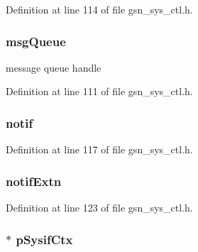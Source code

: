 Definition at line 114 of file gsn\_\-sys\_\-ctl.h.

\hypertarget{a00248_a3525baeed8d9f795ed0c44437f548da2}{
\subsubsection[{msgQueue}]{ {\bf msgQueue}}}
\label{a00248_a3525baeed8d9f795ed0c44437f548da2}
message queue handle 

Definition at line 111 of file gsn\_\-sys\_\-ctl.h.

\hypertarget{a00248_a370ca4360a52490e9882d4057c6acdb8}{
\subsubsection[{notif}]{ {\bf notif}}}
\label{a00248_a370ca4360a52490e9882d4057c6acdb8}


Definition at line 117 of file gsn\_\-sys\_\-ctl.h.

\hypertarget{a00248_a1fe815b73d4c098303ba56581ebf1cd3}{
\subsubsection[{notifExtn}]{ {\bf notifExtn}}}
\label{a00248_a1fe815b73d4c098303ba56581ebf1cd3}


Definition at line 123 of file gsn\_\-sys\_\-ctl.h.

\hypertarget{a00248_a48d2f968a8bd5038d7077bf2e4384997}{
\subsubsection[{pSysifCtx}]{$\ast$ {\bf pSysifCtx}}}
\label{a00248_a48d2f968a8bd5038d7077bf2e4384997}


